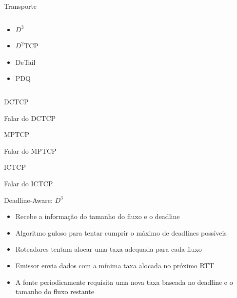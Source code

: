 \documentclass[aspectratio=169]{beamer}
\begin{document}
\begin{frame} {Transporte}
\begin{columns}[t]
\begin{itemize}
\begin{itemize}
                    \item
                          $D^3$
                
                    \item
                            $D^2$TCP
                
                     \item
                        DeTail 
                        
                       \item
                        PDQ 
                                
                \end{itemize}
                        
             \end{itemize}
          \end{columns} 
         
	    \end{frame}
	       
	
	 
            
    \begin{frame} {DCTCP}
      				
   
	  Falar do DCTCP
	        
                
    \end{frame}     
    
    
    
 
    \begin{frame} {MPTCP}
      				
   
	  Falar do MPTCP
	        
                
    \end{frame}     
    
    
    
 
    \begin{frame} {ICTCP}
      				
   
	  Falar do ICTCP
	        
                
    \end{frame}  
    
    
  
    \begin{frame} {Deadline-Aware: $D^3$}
		\begin{itemize}
		 	\item
		 		Recebe a informação do tamanho do fluxo e o deadline
		 	\item
				Algoritmo guloso para tentar cumprir o máximo de deadlines possíveis
		 	\item
				Roteadores tentam alocar uma taxa adequada para cada fluxo
		 	\item
				Emissor envia dados com a mínima taxa alocada no próximo RTT
		 	\item
				A fonte periodicamente requisita uma nova taxa baseada no deadline e o tamanho do fluxo restante
		 \end{itemize}
	\end{frame}
\end{document}
